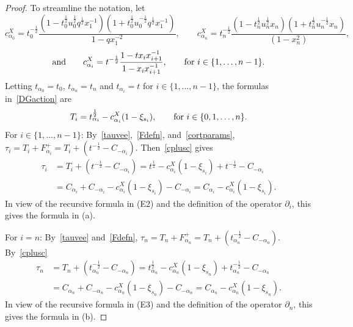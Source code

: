 \documentclass[11pt]{article}
\theoremstyle{plain}
\theoremstyle{definition}
\theoremstyle{remark}
\numberwithin{equation}{section}
\newcounter{r}
\newcounter{s}
\begin{document}
\begin{proof}
To streamline the notation, let
$$c_{\alpha_0}^X = t_0^{-\frac12} 
\frac{(1-t_0^{\frac12}u_0^{\frac12}q^{\frac12}x_1^{-1})
(1+t_0^{\frac12}u_0^{-\frac12}q^{\frac12}x_1^{-1})} {1-qx_1^{-2}},
\qquad
c_{\alpha_n}^X =  t_n^{-\frac12} \frac{(1-t_n^{\frac12}u_n^{\frac12} x_n)(1+t_n^{\frac12}u_n^{-\frac12}x_n)}{(1-x_n^2)},
$$
$$\hbox{and}\qquad
c_{\alpha_i}^X = t^{-\frac12}\frac{1-tx_ix_{i+1}^{-1}}{1-x_ix_{i+1}^{-1}},\qquad\hbox{for $i\in \{1, \ldots, n-1\}$.} 
$$
Letting $t_{\alpha_0} = t_0$, $t_{\alpha_n} = t_n$ and $t_{\alpha_i} = t$ for $i\in \{1, \ldots, n-1\}$, 
the formulas in~\eqref{DGaction} are
$$T_i = t_{\alpha_i}^{\frac12} - c_{\alpha_i}^X(1-\xi_{s_i}), 
\qquad\hbox{for $i\in \{0,1,\ldots, n\}$.}
$$
For $i\in \{1,\ldots, n-1\}$:  
By~\eqref{tauvee},~\eqref{Fdefn}, and~\eqref{cortparams}, 
$\tau_i = T_i+ F^+_{\alpha_i} = T_i + (t^{-\frac12}- C_{-\alpha_i})$.  Then~\eqref{cplusc} gives
\begin{align*}
\tau_i 
&= T_i + (t^{-\frac12} - C_{-\alpha_i})
=t^{\frac12}-c_{\alpha_i}^X (1-\xi_{s_i}) + t^{-\frac12} - C_{-\alpha_i}
\\
&=C_{\alpha_i}+C_{-\alpha_i} -  c_{\alpha_i}^X (1-\xi_{s_i}) - C_{-\alpha_i}
= C_{\alpha_i} -  c_{\alpha_i}^X (1-\xi_{s_i}).
\end{align*}
In view of the recursive formula in (E2) and the definition of the operator $\partial_i$, this gives the formula in (a).


\smallskip\noindent
For $i=n$:
By~\eqref{tauvee} and~\eqref{Fdefn}, 
$\tau_n = T_n+ F^+_{\alpha_n} = T_n + (t^{-\frac12}_{\alpha_n}- C_{-\alpha_n})$.  By~\eqref{cplusc}
\begin{align*}
\tau_n 
&= T_n+(t^{-\frac12}_{\alpha_n} - C_{-\alpha_n}) 
=t^{\frac12}_{\alpha_n}-c_{\alpha_n}^X (1-\xi_{s_n}) + t^{-\frac12}_{\alpha_n} - C_{-\alpha_n}
\\
&=C_{\alpha_n}+C_{-\alpha_n} -  c_{\alpha_n}^X (1-\xi_{s_n}) - C_{-\alpha_n}
= C_{\alpha_n}  -  c_{\alpha_n}^X (1-\xi_{s_n}).
\end{align*}
In view of the recursive formula in (E3) and the definition of the operator $\partial_n$, this gives the formula in (b).


\end{proof}
\end{document}
